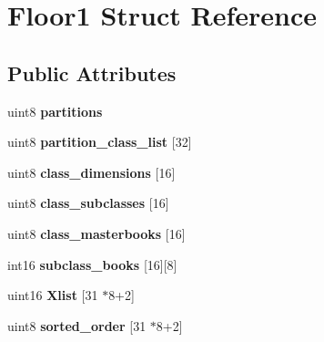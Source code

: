 \hypertarget{struct_floor1}{}\section{Floor1 Struct Reference}
\label{struct_floor1}
\subsection*{Public Attributes}
\begin{DoxyCompactItemize}
\item 
uint8 {\bfseries partitions}\hypertarget{struct_floor1_a4dee145bcd73bc21fee38a83ef91a056}{}\label{struct_floor1_a4dee145bcd73bc21fee38a83ef91a056}

\item 
uint8 {\bfseries partition\+\_\+class\+\_\+list} \mbox{[}32\mbox{]}\hypertarget{struct_floor1_af59d85fae4137a1926954355056f24dc}{}\label{struct_floor1_af59d85fae4137a1926954355056f24dc}

\item 
uint8 {\bfseries class\+\_\+dimensions} \mbox{[}16\mbox{]}\hypertarget{struct_floor1_ab7adeb3e2d518eddd510c525e14c0421}{}\label{struct_floor1_ab7adeb3e2d518eddd510c525e14c0421}

\item 
uint8 {\bfseries class\+\_\+subclasses} \mbox{[}16\mbox{]}\hypertarget{struct_floor1_af3004149b67bcab60a25afb51ea07f87}{}\label{struct_floor1_af3004149b67bcab60a25afb51ea07f87}

\item 
uint8 {\bfseries class\+\_\+masterbooks} \mbox{[}16\mbox{]}\hypertarget{struct_floor1_ad10936c904d13820156191fcc25c7b07}{}\label{struct_floor1_ad10936c904d13820156191fcc25c7b07}

\item 
int16 {\bfseries subclass\+\_\+books} \mbox{[}16\mbox{]}\mbox{[}8\mbox{]}\hypertarget{struct_floor1_af51fdc5e2e82b6357285e2d302b35230}{}\label{struct_floor1_af51fdc5e2e82b6357285e2d302b35230}

\item 
uint16 {\bfseries Xlist} \mbox{[}31 $\ast$8+2\mbox{]}\hypertarget{struct_floor1_a2c09f98b7613ec990add2467ea39f240}{}\label{struct_floor1_a2c09f98b7613ec990add2467ea39f240}

\item 
uint8 {\bfseries sorted\+\_\+order} \mbox{[}31 $\ast$8+2\mbox{]}\hypertarget{struct_floor1_a7e6efe1155cfafd2eeb2cdcc39f121a1}{}\label{struct_floor1_a7e6efe1155cfafd2eeb2cdcc39f121a1}


\end{DoxyCompactItemize}
